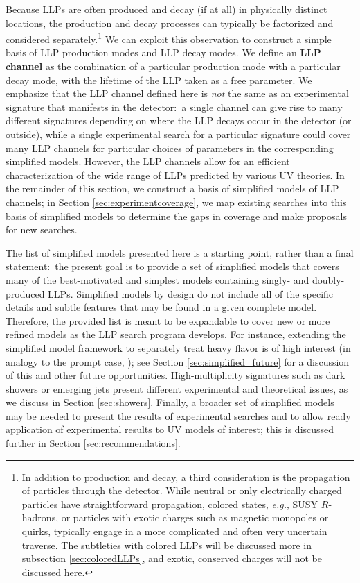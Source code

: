 Because LLPs are often produced and decay (if at all) in physically distinct locations, the production and decay processes can typically be factorized and  considered separately.\footnote{In addition to production and decay, a third consideration is the propagation of particles through the detector.  While neutral or only electrically charged particles have straightforward propagation, colored states, \emph{e.g.}, SUSY $R$-hadrons, or particles with exotic charges such as magnetic monopoles or quirks, typically engage in a more complicated and often very uncertain traverse.  The subtleties with colored LLPs will be discussed more in subsection \ref{sec:coloredLLPs}, and exotic, conserved charges will not be discussed here.}  
We can exploit this observation to construct a simple basis of LLP production modes and LLP decay modes. We define an {\bf LLP channel} as the combination of a particular production mode with a particular decay mode, with the lifetime of the LLP taken as a free parameter. We emphasize that the LLP channel defined here is \emph{not} the same as an experimental signature that manifests in the detector:~a single channel can give rise to many different signatures depending on where the LLP decays occur in the detector (or outside), while a single experimental search for a particular signature could cover many LLP channels for particular choices of parameters in the corresponding simplified models. However, the LLP channels allow for an efficient characterization of the wide range of LLPs predicted by various UV theories. In the remainder of this section, we construct a basis of simplified models of LLP channels;
in Section \ref{sec:experimentcoverage}, we map existing searches into this basis of simplified models to determine the gaps in coverage and make proposals for new searches.

The list of simplified models presented here is  a starting point, rather than a final statement:~the present goal is to provide a set of simplified models that covers many of the best-motivated and simplest models containing singly- and doubly-produced LLPs. Simplified models by design do not include all of the specific details and subtle features that may be found in a given complete model.  Therefore, the provided list is meant to be expandable to cover new or more refined models as the LLP search program develops.  For instance,  extending the simplified model framework to separately treat heavy flavor is of high interest (in analogy to the prompt case, \cite{Essig:2011qg,Brust:2011tb,Papucci:2011wy}); see Section \ref{sec:simplified_future} for a discussion of this and other future opportunities.   High-multiplicity signatures such as dark showers or emerging jets present different experimental and theoretical issues, as we discuss in  Section \ref{sec:showers}. Finally, a broader set of simplified models may be needed to present the results of experimental searches and to allow ready application of experimental results to UV models of interest; this is discussed further in Section \ref{sec:recommendations}.

